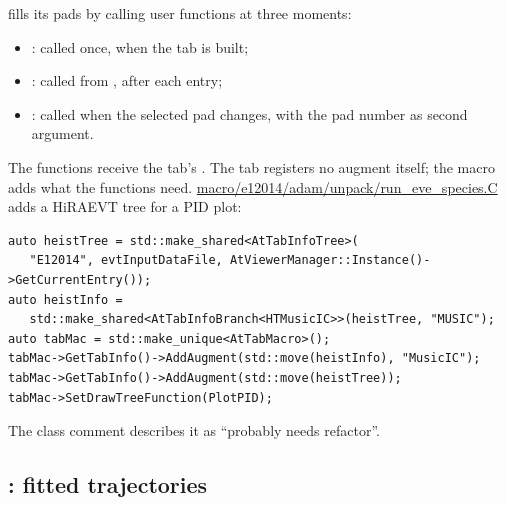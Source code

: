  fills its pads by calling user functions
at three moments:
\begin{itemize}
  \item {}: called once, when the tab is built;
  \item {}: called from , after each entry;
  \item {}: called when the selected pad changes, with the
        pad number as second argument.
\end{itemize}
The functions receive the tab's . The tab registers no augment itself; the macro
adds what the functions need. \url{macro/e12014/adam/unpack/run_eve_species.C} adds a HiRAEVT
tree for a PID plot:
\begin{verbatim}
auto heistTree = std::make_shared<AtTabInfoTree>(
   "E12014", evtInputDataFile, AtViewerManager::Instance()->GetCurrentEntry());
auto heistInfo =
   std::make_shared<AtTabInfoBranch<HTMusicIC>>(heistTree, "MUSIC");
auto tabMac = std::make_unique<AtTabMacro>();
tabMac->GetTabInfo()->AddAugment(std::move(heistInfo), "MusicIC");
tabMac->GetTabInfo()->AddAugment(std::move(heistTree));
tabMac->SetDrawTreeFunction(PlotPID);
\end{verbatim}
The class comment describes it as ``probably needs refactor''.

\subsection{: fitted trajectories}

